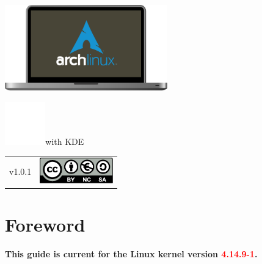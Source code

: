 \vspace*{\fill}
\includegraphics[height=10em]{img/ArchMBP.pdf}\linebreak
\begin{mdframed}[style=titlebox]
	\centering
	\begin{Huge}
		\par
	\end{Huge}
\end{mdframed}
\vspace*{2em}
\includegraphics[height=5em]{img/kde-logo.pdf}with KDE\par
\vspace*{\fill}
\begin{tabularx}{0.95\textwidth}{lR}
	v1.0.1 & \includegraphics[height=3em]{../common/licenses/by-nc-sa_eu.pdf}
\end{tabularx}
\vspace*{2em}

\setcounter{page}{1}
\pagecolor{white}
\color{dark}
\normalsize\justify
\tableofcontents
\clearpage

\clearpage
\section{Foreword}

\begin{flushright}
	\textbf{This guide is current for the Linux kernel version \textcolor{red}{4.14.9-1}.}
\end{flushright}

